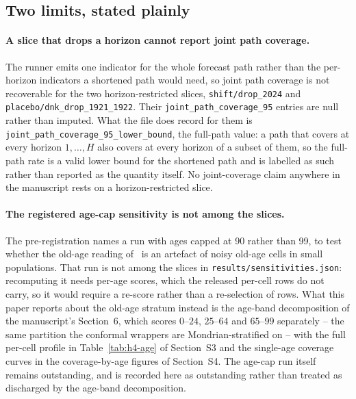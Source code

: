 \subsection{Two limits, stated plainly}
\label{supp:robustness-limits}

\paragraph{A slice that drops a horizon cannot report joint path coverage.} The
runner emits one indicator for the whole forecast path rather than the
per-horizon indicators a shortened path would need, so joint path coverage is
not recoverable for the two horizon-restricted slices,
\texttt{shift/drop\_2024} and \texttt{placebo/dnk\_drop\_1921\_1922}. Their
\texttt{joint\_path\_coverage\_95} entries are null rather than imputed. What
the file does record for them is
\texttt{joint\_path\_coverage\_95\_lower\_bound}, the full-path value: a path
that covers at every horizon $1,\dots,H$ also covers at every horizon of a
subset of them, so the full-path rate is a valid lower bound for the shortened
path and is labelled as such rather than reported as the quantity itself. No
joint-coverage claim anywhere in the manuscript rests on a horizon-restricted
slice.

\paragraph{The registered age-cap sensitivity is not among the slices.} The
pre-registration names a run with ages capped at 90 rather than 99, to test
whether the old-age reading of \Hfour\ is an artefact of noisy old-age cells in
small populations. That run is not among the slices in
\texttt{results/sensitivities.json}: recomputing it needs per-age scores, which
the released per-cell rows do not carry, so it would require a re-score rather
than a re-selection of rows. What this paper reports about the old-age stratum
instead is the age-band decomposition of the manuscript's Section~6, which
scores $0$--$24$, $25$--$64$ and $65$--$99$ separately -- the same partition the
conformal wrappers are Mondrian-stratified on -- with the full per-cell profile
in Table~\ref{tab:h4-age} of Section~S3 and the single-age coverage curves in
the coverage-by-age figures of Section~S4. The age-cap run itself remains
outstanding, and is recorded here as outstanding rather than treated as
discharged by the age-band decomposition.
